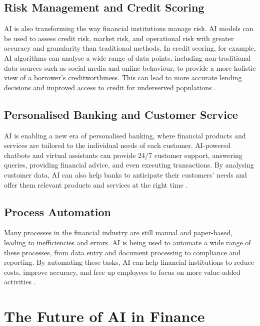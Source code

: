 \subsection{Risk Management and Credit Scoring}

AI is also transforming the way financial institutions manage risk. AI models can be used to assess credit risk, market risk, and operational risk with greater accuracy and granularity than traditional methods. In credit scoring, for example, AI algorithms can analyse a wide range of data points, including non-traditional data sources such as social media and online behaviour, to provide a more holistic view of a borrower's creditworthiness. This can lead to more accurate lending decisions and improved access to credit for underserved populations \parencite{rustandi2025ai}.

\subsection{Personalised Banking and Customer Service}

AI is enabling a new era of personalised banking, where financial products and services are tailored to the individual needs of each customer. AI-powered chatbots and virtual assistants can provide 24/7 customer support, answering queries, providing financial advice, and even executing transactions. By analysing customer data, AI can also help banks to anticipate their customers' needs and offer them relevant products and services at the right time \parencite{fma2024understanding}.

\subsection{Process Automation}

Many processes in the financial industry are still manual and paper-based, leading to inefficiencies and errors. AI is being used to automate a wide range of these processes, from data entry and document processing to compliance and reporting. By automating these tasks, AI can help financial institutions to reduce costs, improve accuracy, and free up employees to focus on more value-added activities \parencite{lopez2019artificial}.

\section{The Future of AI in Finance}


